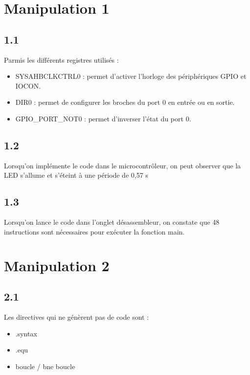 \documentclass[a4paper,12pt,notitlepage,oneside]{article}
\begin{document}
\section{Manipulation 1}

\subsection*{1.1}

Parmis les différents registres utilisés : 

\begin{itemize}
   \item SYSAHBCLKCTRL0 : permet d'activer l'horloge des périphériques GPIO et IOCON.
   \item DIR0 : permet de configurer les broches du port 0 en entrée ou en sortie.
   \item GPIO\_PORT\_NOT0 : permet d'inverser l'état du port 0.
\end{itemize}


\subsection*{1.2}

Lorsqu'on implémente le code dans le microcontrôleur, on peut observer que la LED s'allume et s'éteint à une période de 0,57 s

\subsection*{1.3}

Lorsqu'on lance le code dans l'onglet désassembleur, on constate que 48 instructions sont nécessaires pour exécuter la fonction main. 

\vspace{1cm}

\section{Manipulation 2}

\subsection*{2.1}

Les directives qui ne génèrent pas de code sont :
\begin{itemize}
   \item .syntax
   \item .equ
   \item boucle / bne boucle
\end{itemize}
\end{document}
